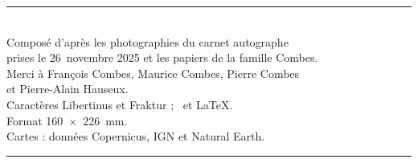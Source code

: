 \LJpagepaire%
\thispagestyle{vide}
\vspace*{\fill}
\begin{center}
\footnotesize
\rule{20mm}{0.4pt}\\[3mm]
Composé d'après les photographies du carnet autographe\\
prises le 26~novembre 2025 et les papiers de la famille Combes.\\[2mm]
Merci à François Combes, Maurice Combes, Pierre Combes\\
et Pierre-Alain Hauseux.\\[2mm]
Caractères Libertinus et Fraktur ; \XeTeX\ et \LaTeX.\\
Format 160~×~226~mm.\\
Cartes : données Copernicus, IGN et Natural Earth.\\[3mm]
\rule{20mm}{0.4pt}
\end{center}
\vspace*{\fill}
